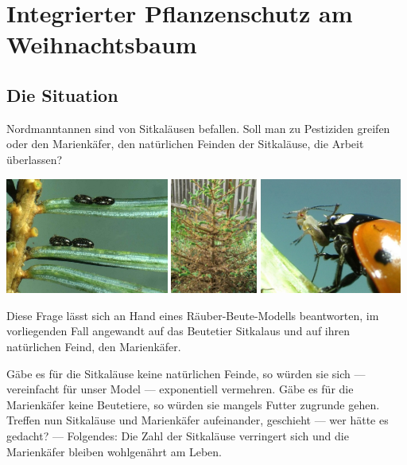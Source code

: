 \documentclass[%
11pt,%
twoside,%
titlepage,%
german,%
headsepline%
]{scrartcl}
\begin{document}
\clearpage

\section{Integrierter Pflanzenschutz am Weihnachtsbaum}
\subsection{Die Situation}
Nordmanntannen sind von Sitkaläusen befallen. Soll man zu Pestiziden greifen oder den Marienkäfer, den natürlichen Feinden der Sitkaläuse, die Arbeit überlassen?
\\[2ex]

\begin{center}
\includegraphics[height=3.8cm]{pictures/sitkalauseier.jpg}
\includegraphics[height=3.8cm]{pictures/tannenbaum.jpg}
\includegraphics[height=3.8cm]{pictures/marienkaefer.jpg}
\end{center}

Diese Frage lässt sich an Hand eines Räuber-Beute-Modells beantworten, im vorliegenden Fall angewandt auf das Beutetier Sitkalaus und auf ihren natürlichen Feind, den Marienkäfer.

Gäbe es für die Sitkaläuse keine natürlichen Feinde, so würden sie sich --- vereinfacht für unser Model --- exponentiell vermehren. Gäbe es für die Marienkäfer keine Beutetiere, so würden sie mangels Futter zugrunde gehen. Treffen nun Sitkaläuse und Marienkäfer aufeinander, geschieht --- wer hätte es gedacht? --- Folgendes: Die Zahl der Sitkaläuse verringert sich und die Marienkäfer bleiben wohlgenährt am Leben.
\end{document}
